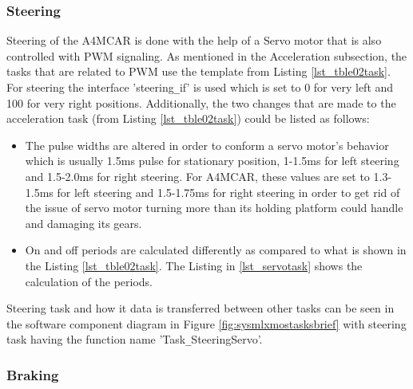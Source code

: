 \subsubsection{Steering}
Steering of the A4MCAR is done with the help of a Servo motor that is also controlled with PWM signaling. As mentioned in the Acceleration subsection, the tasks that are related to PWM use the template from Listing \ref{lst_tble02task}. For steering the interface 'steering\texttt{\_}if' is used which is set to 0 for very left and 100 for very right positions. Additionally, the two changes that are made to the acceleration task (from Listing \ref{lst_tble02task}) could be listed as follows:
\begin{itemize}
	\item The pulse widths are altered in order to conform a servo motor's behavior which is usually 1.5ms pulse for stationary position, 1-1.5ms for left steering and 1.5-2.0ms for right steering. For A4MCAR, these values are set to 1.3-1.5ms for left steering and 1.5-1.75ms for right steering in order to get rid of the issue of servo motor turning more than its holding platform could handle and damaging its gears.
	\item On and off periods are calculated differently as compared to what is shown in the Listing \ref{lst_tble02task}. The Listing in \ref{lst_servotask} shows the calculation of the periods.
	
\end{itemize}

Steering task and how it data is transferred between other tasks can be seen in the software component diagram in Figure \ref{fig:sysmlxmostasksbrief} with steering task having the function name 'Task\texttt{\_}SteeringServo'.

\subsubsection{Braking}
